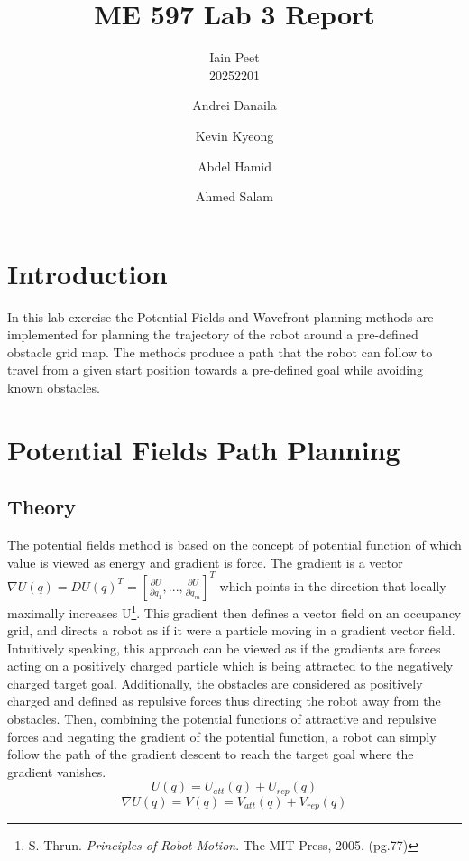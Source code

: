 \documentclass[11pt]{article} %
\title{ME 597 Lab 3 Report}
\author{Iain Peet \\ 20252201 
\and Andrei Danaila 
\and Kevin Kyeong 
\and Abdel Hamid 
\and Ahmed Salam}
\begin{document}
\maketitle

\clearpage

\section*{Introduction}
In this lab exercise the Potential Fields and Wavefront planning methods are implemented for planning the trajectory of the robot around a pre-defined obstacle grid map. The methods produce a path that the robot can follow to travel from a given start position towards a pre-defined goal while avoiding known obstacles.

\section{Potential Fields Path Planning}
\subsection{Theory}
The potential fields method is based on the concept of potential function of which value is viewed as energy and gradient is force.  The gradient is a vector $\nabla U(q) = DU(q)^T = [\frac{\partial U}{\partial q_1}, . . . , \frac{\partial U}{\partial q_m}]^T$ which points in the direction that locally maximally increases U\footnote{S. Thrun. \emph{Principles of Robot Motion}. The MIT Press, 2005. (pg.77)}.  This gradient then defines a vector field on an occupancy grid, and directs a robot as if it were a particle moving in a gradient vector field\footnotemark[\value{footnote}].  Intuitively speaking, this approach can be viewed as if the gradients are forces acting on a positively charged particle which is being attracted to the negatively charged target goal\footnotemark[\value{footnote}].  Additionally, the obstacles are considered as positively charged and defined as repulsive forces thus directing the robot away from the obstacles.  Then, combining the potential functions of attractive and repulsive forces and negating the gradient of the potential function, a robot can simply follow the path of the gradient descent to reach the target goal where the gradient vanishes.
\begin{equation}
	U(q) = U_{att}(q) + U_{rep}(q)
\end{equation}
\begin{equation}
	\nabla U(q) = V(q) = V_{att}(q) + V_{rep}(q)
\end{equation}
\end{document}
